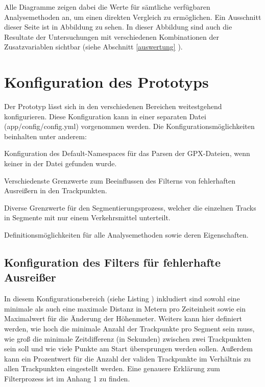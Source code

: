 Alle Diagramme zeigen dabei die Werte für sämtliche verfügbaren Analysemethoden an, um einen direkten Vergleich zu ermöglichen. Ein Ausschnitt dieser Seite ist in Abbildung  zu sehen. In dieser Abbildung sind auch die Resultate der Untersuchungen mit verschiedenen Kombinationen der Zusatzvariablen sichtbar (siehe Abschnitt \ref{auswertung} ).


\section{Konfiguration des Prototyps}
Der Prototyp lässt sich in den verschiedenen Bereichen weitestgehend konfigurieren. Diese Konfiguration kann in einer separaten Datei (app/config/config.yml) vorgenommen werden. Die Konfigurationsmöglichkeiten beinhalten unter anderem:
\begin{pitemize}
\item Konfiguration des Default-Namespaces für das Parsen der GPX-Dateien, wenn keiner in der Datei gefunden wurde.
\item Verschiedenste Grenzwerte zum Beeinflussen des Filterns von fehlerhaften Ausreißern in den Trackpunkten.
\item Diverse Grenzwerte für den Segmentierungsprozess, welcher die einzelnen Tracks in Segmente mit nur einem Verkehrsmittel unterteilt.
\item Definitionsmöglichkeiten für alle Analysemethoden sowie deren Eigenschaften.
\end{pitemize}

\subsection{Konfiguration des Filters für fehlerhafte Ausreißer}
In diesem Konfigurationsbereich (siehe Listing ) inkludiert sind sowohl eine minimale als auch eine maximale Distanz in Metern pro Zeiteinheit sowie ein Maximalwert für die Änderung der Höhenmeter. Weiters kann hier definiert werden, wie hoch die minimale Anzahl der Trackpunkte pro Segment sein muss, wie groß die minimale Zeitdifferenz (in Sekunden) zwischen zwei Trackpunkten sein soll und wie viele Punkte am Start übersprungen werden sollen. Außerdem kann ein Prozentwert für die Anzahl der validen Trackpunkte im Verhältnis zu allen Trackpunkten eingestellt werden. Eine genauere Erklärung zum Filterprozess ist im Anhang 1 zu finden.

